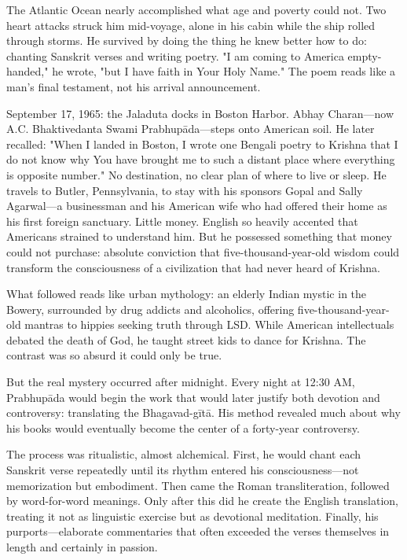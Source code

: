 \documentclass[12pt,twoside]{book}
\begin{document}
The Atlantic Ocean nearly accomplished what age and poverty could not. Two heart attacks struck him mid-voyage, alone in his cabin while the ship rolled through storms. He survived by doing the thing he knew better how to do: chanting Sanskrit verses and writing poetry. "I am coming to America empty-handed," he wrote, "but I have faith in Your Holy Name." The poem reads like a man's final testament, not his arrival announcement.

September 17, 1965: the Jaladuta docks in Boston Harbor. Abhay Charan—now A.C. Bhaktivedanta Swami Prabhupāda—steps onto American soil. He later recalled: "When I landed in Boston, I wrote one Bengali poetry to Krishna that I do not know why You have brought me to such a distant place where everything is opposite number." No destination, no clear plan of where to live or sleep. He travels to Butler, Pennsylvania, to stay with his sponsors Gopal and Sally Agarwal—a businessman and his American wife who had offered their home as his first foreign sanctuary. Little money. English so heavily accented that Americans strained to understand him. But he possessed something that money could not purchase: absolute conviction that five-thousand-year-old wisdom could transform the consciousness of a civilization that had never heard of Krishna.

What followed reads like urban mythology: an elderly Indian mystic in the Bowery, surrounded by drug addicts and alcoholics, offering five-thousand-year-old mantras to hippies seeking truth through LSD. While American intellectuals debated the death of God, he taught street kids to dance for Krishna. The contrast was so absurd it could only be true.

But the real mystery occurred after midnight. Every night at 12:30 AM, Prabhupāda would begin the work that would later justify both devotion and controversy: translating the Bhagavad-gītā. His method revealed much about why his books would eventually become the center of a forty-year controversy.

The process was ritualistic, almost alchemical. First, he would chant each Sanskrit verse repeatedly until its rhythm entered his consciousness—not memorization but embodiment. Then came the Roman transliteration, followed by word-for-word meanings. Only after this did he create the English translation, treating it not as linguistic exercise but as devotional meditation. Finally, his purports—elaborate commentaries that often exceeded the verses themselves in length and certainly in passion.
\end{document}
